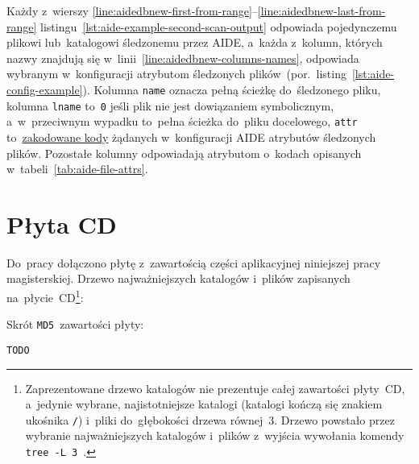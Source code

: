 \documentclass[thesis]{subfiles}
\begin{document}
\begin{appendices}
Każdy z~wierszy \ref{line:aidedbnew-first-from-range}--\ref{line:aidedbnew-last-from-range} listingu~\ref{lst:aide-example-second-scan-output} odpowiada pojedynczemu plikowi lub~katalogowi śledzonemu przez AIDE, a~każda z~kolumn, których nazwy znajdują się w~linii~\ref{line:aidedbnew-columns-names}, odpowiada wybranym w~konfiguracji atrybutom śledzonych plików~(por.~listing~\ref{lst:aide-config-example}). Kolumna \texttt{name} oznacza pełną ścieżkę do~śledzonego pliku, kolumna \texttt{lname} to~\texttt{0} jeśli plik nie jest dowiązaniem symbolicznym, a~w~przeciwnym wypadku to~pełna ścieżka do~pliku docelowego, \texttt{attr} to~\href{https://unix.stackexchange.com/questions/342693/understanding-aide-db/343020}{zakodowane kody} żądanych w~konfiguracji AIDE atrybutów śledzonych plików. Pozostałe kolumny odpowiadają atrybutom o~kodach opisanych w~tabeli~\ref{tab:aide-file-attrs}.



\chapter{Płyta CD}
\label{ch:cd-appendix}

Do~pracy dołączono płytę z~zawartością części aplikacyjnej niniejszej pracy magisterskiej. Drzewo najważniejszych katalogów i~plików zapisanych na~płycie~CD\footnote{Zaprezentowane drzewo katalogów nie prezentuje całej zawartości płyty~CD, a~jedynie wybrane, najistotniejsze katalogi (katalogi kończą się znakiem ukośnika \texttt{/}) i~pliki do~głębokości drzewa równej~3. Drzewo powstało przez wybranie najważniejszych katalogów i~plików z~wyjścia wywołania komendy \mbox{\texttt{tree~-L~3}}~\cite{tree-manual}.}:

{\footnotesize
{}
}

\noindent Skrót \texttt{MD5}~zawartości płyty:\mynobreakpar
\begin{center}
\texttt{TODO}
\end{center}


\end{appendices}
\end{document}
